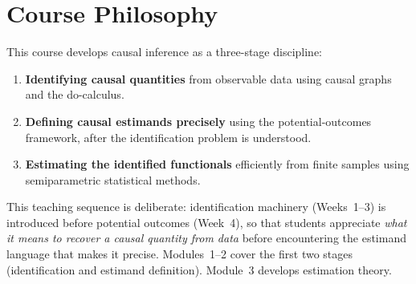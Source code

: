 \documentclass[12pt]{article}
\begin{document}
\newpage
\tableofcontents
\newpage

\section{Course Philosophy}

This course develops causal inference as a three-stage discipline:

\begin{enumerate}
  \item \textbf{Identifying causal quantities} from observable data using
    causal graphs and the do-calculus.
  \item \textbf{Defining causal estimands precisely} using the
    potential-outcomes framework, after the identification problem is
    understood.
  \item \textbf{Estimating the identified functionals} efficiently from
    finite samples using semiparametric statistical methods.
\end{enumerate}

This teaching sequence is deliberate: identification machinery (Weeks~1--3)
is introduced before potential outcomes (Week~4), so that students appreciate
\emph{what it means to recover a causal quantity from data} before encountering
the estimand language that makes it precise.
Modules~1--2 cover the first two stages (identification and estimand
definition). Module~3 develops estimation theory.
\end{document}
